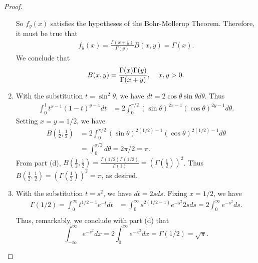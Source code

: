 \documentclass[12pt]{article}
\theoremstyle{remark}
\theoremstyle{named}
\newcommand{\infint}{\int_{-\infty}^{\infty}}
\newcommand{\g}{\Gamma}
\begin{document}
\begin{proof}
\begin{enumerate}
\begin{enumerate}
        \end{enumerate}
        So \(f_y(x)\) satisfies the hypotheses of the Bohr-Mollerup Theorem. Therefore, it must be true that
        \begin{align*}
            f_y(x) = \frac{\g(x + y)}{\g(y)} B(x, y) = \g(x).
        \end{align*}
        We conclude that 
        \[B(x, y) = \frac{\g(x)\g(y)}{\g(x + y)}, \hspace*{4mm} x, y > 0.\]
        \item With the substitution \(t = \sin^2 \theta\), we have \(dt = 2 \cos \theta \sin \theta d \theta\). Thus
        \begin{align*}
            \int_{0}^{1} t^{x - 1} (1 - t)^{y - 1} dt &= 2\int_{0}^{\pi/2} (\sin \theta)^{2x - 1} (\cos \theta)^{2y - 1} d \theta.
        \end{align*}
        Setting \(x = y = 1/2\), we have
        \begin{align*}
            B\left(\frac{1}{2}, \frac{1}{2}\right) &= 2\int_{0}^{\pi/2} (\sin \theta)^{2(1/2) - 1} (\cos \theta)^{2(1/2) - 1} d \theta \\
            &= \int_{0}^{\pi/2}d \theta = 2\pi / 2 = \pi.
        \end{align*}
        From part (d), \(B(\frac{1}{2}, \frac{1}{2}) = \frac{\g(1/2)\g(1/2)}{\g(1)} = (\g(\frac{1}{2}))^2\). Thus \(B(\frac{1}{2}, \frac{1}{2}) = (\g(\frac{1}{2}))^2 = \pi\), as desired.

        \item With the substitution \(t = s^2\), we have \(dt = 2 s ds\). Fixing \(x = 1/2\), we have 
        \begin{align*}
            \g(1/2) = \int_{0}^{\infty} t^{1/2 - 1} e^{-t} dt &= \int_{0}^{\infty} s^{2(1/2 - 1)} e^{-s^2} 2s ds = 2\int_{0}^{\infty} e^{- s^2} ds. \\
        \end{align*}
        Thus, remarkably, we conclude with part (d) that
        \[\infint e^{-s^2} dx = 2\int_{0}^{\infty} e^{- x^2} dx = \g(1/2) = \sqrt{\pi}.\]
    \end{enumerate}
\end{proof}
\end{document}
